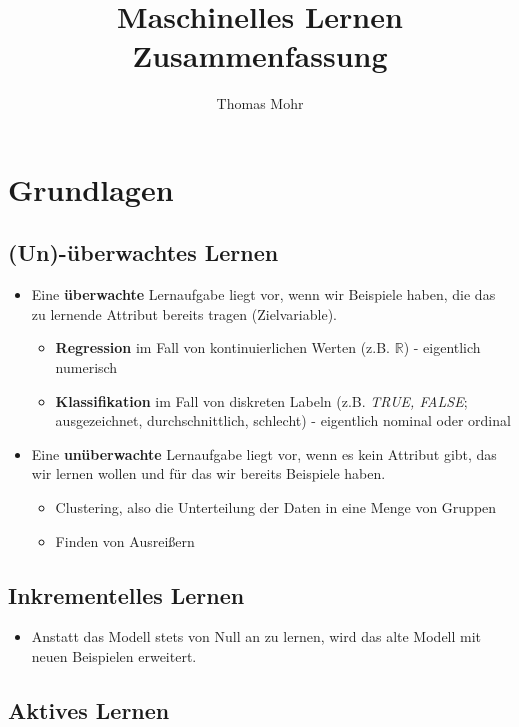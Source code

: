 \documentclass{scrartcl}
\title{Maschinelles Lernen \\ Zusammenfassung}
\author{Thomas Mohr}
\date{}
\begin{document}
\maketitle
\pagebreak
\tableofcontents
\pagebreak

\section{Grundlagen}

\subsection{(Un)-überwachtes Lernen}

\begin{itemize}
	\item Eine \textbf{überwachte} Lernaufgabe liegt vor, wenn wir Beispiele 
	haben, die das zu lernende Attribut bereits tragen (Zielvariable).
	\begin{itemize}
		\item \textbf{Regression} im Fall von kontinuierlichen Werten (z.B. $ 
		\mathbb{R} $) - eigentlich numerisch
		\item \textbf{Klassifikation} im Fall von diskreten Labeln (z.B. 
		\textit{TRUE, FALSE}; ausgezeichnet, durchschnittlich, schlecht) - 
		eigentlich nominal oder ordinal
	\end{itemize}
	\item Eine \textbf{unüberwachte} Lernaufgabe liegt vor, wenn es kein 
	Attribut gibt, das wir lernen wollen und für das wir bereits Beispiele 
	haben.
	\begin{itemize}
		\item Clustering, also die Unterteilung der Daten in eine Menge 
		von Gruppen
		\item Finden von Ausreißern
	\end{itemize}
\end{itemize}

\subsection{Inkrementelles Lernen}

\begin{itemize}
	\item Anstatt das Modell stets von Null an zu lernen, wird das alte Modell 
	mit neuen Beispielen erweitert.
\end{itemize}

\subsection{Aktives Lernen}
\end{document}
